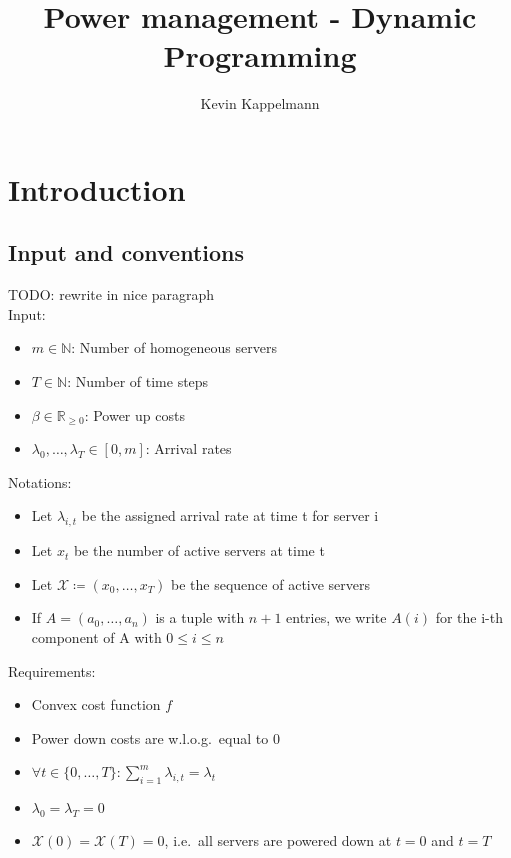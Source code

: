\documentclass[hidelinks]{article}
\title{Power management - Dynamic Programming}
\author{Kevin Kappelmann\\
  \multicolumn{1}{p{.7\textwidth}}{\centering\emph{Chair for Theoretical Computer Science,\\
  Technical University of Munich}}}
\theoremstyle{plain}
\theoremstyle{definition}
\theoremstyle{rem}
\newcommand{\mx}{\mathcal{X}}
\begin{document}

\begin{sloppypar}
\section{Introduction}
\subsection{Input and conventions}
TODO: rewrite in nice paragraph\\
Input:
\begin{itemize}
	\item $m\in\mathbb{N}$: Number of homogeneous servers
	\item $T\in\mathbb{N}$: Number of time steps
	\item $\beta\in\mathbb{R}_{\ge 0}$: Power up costs
	\item $\lambda_0,\ldots,\lambda_{T}\in[0,m]$: Arrival rates
\end{itemize}
Notations:
\begin{itemize}
	\item Let $\lambda_{i,t}$ be the assigned arrival rate at time t for server i
	\item Let $x_t$ be the number of active servers at time t
	\item Let $\mx\coloneqq(x_0,\ldots,x_T)$ be the sequence of active servers
	\item If $A=(a_0,\ldots,a_n)$ is a tuple with $n+1$ entries, we write $A(i)$ for the i-th component of A with $0\le i\le n$
\end{itemize}
Requirements:
\begin{itemize}
	\item Convex cost function $f$
	\item Power down costs are w.l.o.g.\ equal to 0
	\item $\forall t\in \{0,\ldots,T\}:\sum\limits_{i=1}^{m}{\lambda_{i,t}=\lambda_t}$
	\item $\lambda_0=\lambda_T=0$
	\item $\mx(0)=\mx(T)=0$, i.e.\ all servers are powered down at $t=0$ and $t=T$
\end{itemize}


\end{sloppypar}
\end{document}
